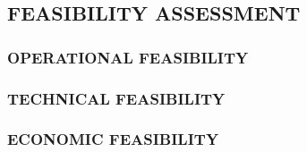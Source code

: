 \subsection{FEASIBILITY ASSESSMENT}
\subsubsection{OPERATIONAL FEASIBILITY}
\subsubsection{TECHNICAL FEASIBILITY}
\subsubsection{ECONOMIC FEASIBILITY}

